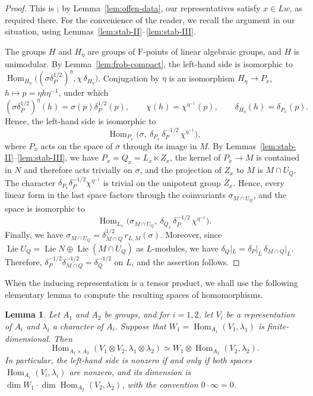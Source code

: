 \documentclass[11pt]{amsart}
\numberwithin{equation}{section}
\theoremstyle{plain}
\newtheorem{lemma}[theorem]{Lemma}
\theoremstyle{definition}
\theoremstyle{remark}
\DeclareMathOperator{\Hom}{Hom}
\DeclareMathOperator{\Lie}{Lie}
\begin{document}
\begin{proof}
	This is \cite[Proposition 4.1]{Off17}; by Lemma~\ref{lem:offen-data}, our representatives satisfy $x\in Lw$, as required there. For the convenience of the reader, we recall the argument in our situation, using Lemmas~\ref{lem:stab-II}--\ref{lem:stab-III}.
	
	The groups $H$ and $H_\eta$ are groups of $\mathrm{F}$-points of linear algebraic groups, and $H$ is unimodular. By Lemma~\ref{lem:frob-compact}, the left-hand side is isomorphic to $\Hom_{H_\eta}\big((\sigma\delta_P^{1/2})^\eta,\chi\,\delta_{H_\eta}\big)$. Conjugation by $\eta$ is an isomorphism $H_\eta\to P_x$, $h\mapsto p=\eta h\eta^{-1}$, under which
	$$
	(\sigma\delta_P^{1/2})^\eta(h)=\sigma(p)\delta_P^{1/2}(p),\qquad\chi(h)=\chi^{\eta^{-1}}(p),\qquad\delta_{H_\eta}(h)=\delta_{P_x}(p).
	$$
	Hence, the left-hand side is isomorphic to
	$$
	\Hom_{P_x}\big(\sigma,\ \delta_{P_x}\,\delta_P^{-1/2}\,\chi^{\eta^{-1}}\big),
	$$
	where $P_x$ acts on the space of $\sigma$ through its image in $M$. By Lemmas~\ref{lem:stab-II}--\ref{lem:stab-III}, we have $P_x=Q_x=L_x\ltimes Z_x$, the kernel of $P_x\to M$ is contained in $N$ and therefore acts trivially on $\sigma$, and the projection of $Z_x$ to $M$ is $M\cap U_Q$. The character $\delta_{P_x}\delta_P^{-1/2}\chi^{\eta^{-1}}$ is trivial on the unipotent group $Z_x$. Hence, every linear form in the last space factors through the coinvariants $\sigma_{M\cap U_Q}$, and the space is isomorphic to
	$$
	\Hom_{L_x}\big(\sigma_{M\cap U_Q},\ \delta_{Q_x}\,\delta_P^{-1/2}\,\chi^{\eta^{-1}}\big).
	$$
	Finally, we have $\sigma_{M\cap U_Q}=\delta_{M\cap Q}^{1/2}\,r_{L,M}(\sigma)$. Moreover, since $\Lie U_Q=\Lie N\oplus\Lie(M\cap U_Q)$ as $L$-modules, we have $\delta_Q|_L=\delta_P|_L\,\delta_{M\cap Q}|_L$. Therefore, $\delta_P^{-1/2}\delta_{M\cap Q}^{-1/2}=\delta_Q^{-1/2}$ on $L$, and the assertion follows.
\end{proof}

When the inducing representation is a tensor product, we shall use the following elementary lemma to compute the resulting spaces of homomorphisms.

\begin{lemma}\label{lem:tensor-hom}
	Let $A_1$ and $A_2$ be groups, and for $i=1,2$, let $V_i$ be a representation of $A_i$ and $\lambda_i$ a character of $A_i$. Suppose that $W_1=\Hom_{A_1}(V_1,\lambda_1)$ is finite-dimensional. Then
	$$
	\Hom_{A_1\times A_2}(V_1\otimes V_2,\lambda_1\otimes\lambda_2)\simeq W_1\otimes\Hom_{A_2}(V_2,\lambda_2).
	$$
	In particular, the left-hand side is nonzero if and only if both spaces $\Hom_{A_i}(V_i,\lambda_i)$ are nonzero, and its dimension is $\dim W_1\cdot\dim\Hom_{A_2}(V_2,\lambda_2)$, with the convention $0\cdot\infty=0$.
\end{lemma}
\end{document}
